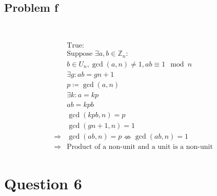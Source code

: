 \documentclass{article}
\begin{document}
~

\subsection*{Problem f}

~

\begin{align*}
    &\text{True}:\\
    &\text{Suppose }\exists a,b\in \mathbb{Z} _n:\\
    &b\in U_n,\gcd(a,n)\ne 1,ab\equiv 1\mod n\\
    &\exists g:ab=gn+1\\
    &p\coloneqq\gcd(a,n)\\
    &\exists k:a=kp\\
    &ab=kpb\\
    &\gcd(kpb,n)=p\\
    &\gcd(gn+1,n)=1\\
    \Rightarrow&\gcd(ab,n)=p\nLeftrightarrow\gcd(ab,n)=1\\
    \Rightarrow&\text{Product of a non-unit and a unit is a non-unit}\\
\end{align*}

\newpage

\section*{Question 6}

~
\end{document}
